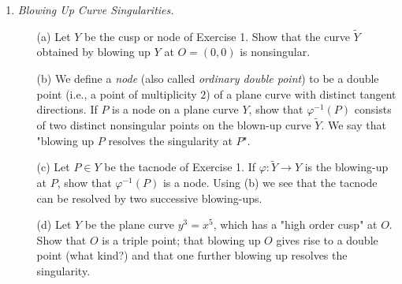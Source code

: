 \documentclass[12pt]{article}
\theoremstyle{definition}
\begin{document}
\begin{enumerate} [label=\textbf{\arabic*.}, leftmargin=-0.05em]
\begin{proof}
\begin{itemize}
        \item[(b)] (a), (b), and (c) has multiplicity $2$, and (d) has multiplicity $3$ at $O = (0, 0)$.
    \end{itemize}
\end{proof}

\item \textit{Blowing Up Curve Singularities.}
\begin{itemize}
    \item[(a)] Let $Y$ be the cusp or node of Exercise 1. Show that the curve $\tilde{Y}$ obtained by blowing up $Y$ at $O = (0, 0)$ is nonsingular.
    \item[(b)] We define a \textit{node} (also called \textit{ordinary double point}) to be a double point (i.e., a point of multiplicity $2$) of a plane curve with distinct tangent directions. If $P$ is a node on a plane curve $Y$, show that $\varphi^{-1}(P)$ consists of two distinct nonsingular points on the blown-up curve $\tilde{Y}$. We say that "blowing up $P$ resolves the singularity at $P$".
    \item[(c)] Let $P \in Y$ be the tacnode of Exercise 1. If $\varphi : \tilde{Y} \to Y$ is the blowing-up at $P$, show that $\varphi^{-1}(P)$ is a node. Using (b) we see that the tacnode can be resolved by two successive blowing-ups.
    \item[(d)] Let $Y$ be the plane curve $y^3 = x^5$, which has a "high order cusp" at $O$. Show that $O$ is a triple point; that blowing up $O$ gives rise to a double point (what kind?) and that one further blowing up resolves the singularity.
\end{itemize}


\end{enumerate}
\end{document}
